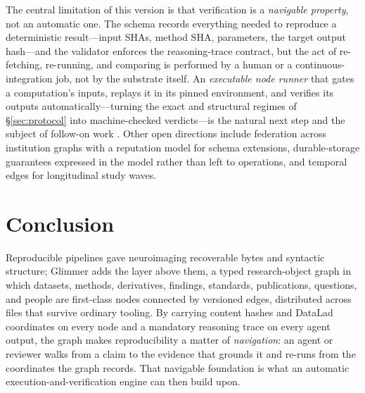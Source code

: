\documentclass[preprint]{glimmer-paper}
\begin{document}
The central limitation of this version is that verification is a \emph{navigable property},
not an automatic one. The schema records everything needed to reproduce a deterministic
result---input SHAs, method SHA, parameters, the target output hash---and the validator
enforces the reasoning-trace contract, but the act of re-fetching, re-running, and
comparing is performed by a human or a continuous-integration job, not by the substrate
itself. An \emph{executable node runner} that gates a computation's inputs, replays it in
its pinned environment, and verifies its outputs automatically---turning the exact and
structural regimes of \S\ref{sec:protocol} into machine-checked verdicts---is the natural
next step and the subject of follow-on work \citep{eldamaty2026proactive}. Other open
directions include federation across institution graphs with a reputation model for schema
extensions, durable-storage guarantees expressed in the model rather than left to
operations, and temporal edges for longitudinal study waves.

\section{Conclusion}

Reproducible pipelines gave neuroimaging recoverable bytes and syntactic structure;
Glimmer adds the layer above them, a typed research-object graph in which datasets,
methods, derivatives, findings, standards, publications, questions, and people are
first-class nodes connected by versioned edges, distributed across files that survive
ordinary tooling. By carrying content hashes and DataLad coordinates on every node and a
mandatory reasoning trace on every agent output, the graph makes reproducibility a matter
of \emph{navigation}: an agent or reviewer walks from a claim to the evidence that grounds
it and re-runs from the coordinates the graph records. That navigable foundation is what an
automatic execution-and-verification engine can then build upon.



\end{document}
